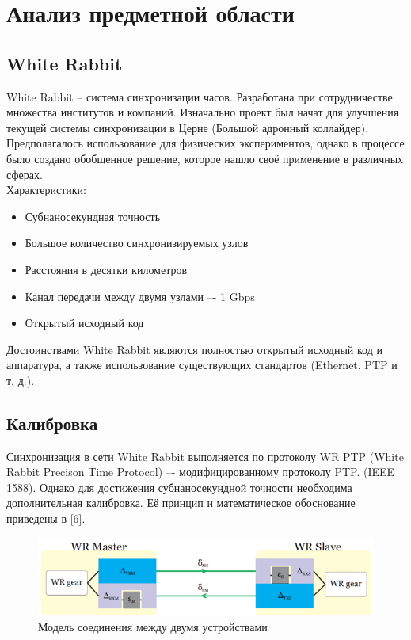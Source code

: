 \chapter{Анализ предметной области} \label{ch1}

\section{White Rabbit} \label{ch1:sec1}

White Rabbit -- система синхронизации часов. Разработана при сотрудничестве множества
институтов и компаний. Изначально проект был начат для улучшения текущей системы синхронизации в Церне (Большой адронный коллайдер).
Предполагалось использование для физических экспериментов, однако в процессе было создано обобщенное решение,
которое нашло своё применение в различных сферах.\\

\noindent Характеристики:

\begin{itemize}
	\item Субнаносекундная точность
	\item Большое количество синхронизируемых узлов
	\item Расстояния в десятки километров
	\item Канал передачи между двумя узлами –- 1 Gbps
	\item Открытый исходный код\\
\end{itemize}

Достоинствами White Rabbit являются полностью открытый исходный код и аппаратура, а также 
использование существующих стандартов (Ethernet, PTP и т. д.).

\section{Калибровка}

Синхронизация в сети White Rabbit выполняется по протоколу WR PTP (White Rabbit Precison Time Protocol) –- модифицированному протоколу PTP. (IEEE 1588).
Однако для достижения субнаносекундной точности необходима дополнительная калибровка. Её принцип и математическое обоснование приведены в [6].

\begin{figure}[ht!] 
	\center
	\includegraphics  {my_folder/images//conn_model}
	\caption{Модель соединения между двумя устройствами} 
	\label{fig:conn-model}  
\end{figure}

